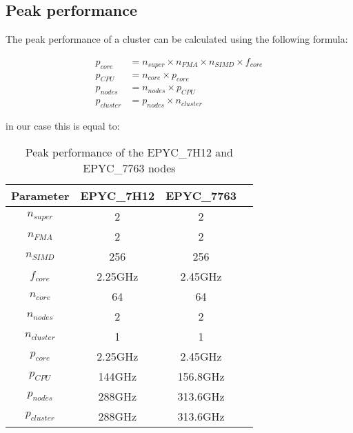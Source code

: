 \documentclass[unicode,11pt,a4paper,oneside,numbers=endperiod,openany]{scrartcl}
\begin{document}
\subsection{Peak performance}

The peak performance of a cluster can be calculated using the following formula:


\begin{align*}
    p_{core}    & = n_{super} \times n_{FMA} \times n_{SIMD} \times f_{core} \\
    p_{CPU}     & = n_{core} \times p_{core}                                 \\
    p_{nodes}   & = n_{nodes} \times p_{CPU}                                 \\
    p_{cluster} & = p_{nodes} \times n_{cluster}
\end{align*}


in our case this is equal to:

\begin{table}
    \centering

    \begin{tabular}{|c|c|c|c}
        \hline
        \textbf{Parameter} & \textbf{EPYC\_7H12} & \textbf{EPYC\_7763} \\
        \hline
        $n_{super}$        & 2                   & 2                   \\
        \hline
        $n_{FMA}$          & 2                   & 2                   \\
        \hline
        $n_{SIMD}$         & 256                 & 256                 \\
        \hline
        $f_{core}$         & 2.25GHz             & 2.45GHz             \\
        \hline
        $n_{core}$         & 64                  & 64                  \\
        \hline
        $n_{nodes}$        & 2                   & 2                   \\
        \hline
        $n_{cluster}$      & 1                   & 1                   \\
        \hline
        $p_{core}$         & 2.25GHz             & 2.45GHz             \\
        \hline
        $p_{CPU}$          & 144GHz              & 156.8GHz            \\
        \hline
        $p_{nodes}$        & 288GHz              & 313.6GHz            \\
        \hline
        $p_{cluster}$      & 288GHz              & 313.6GHz            \\
        \hline
    \end{tabular}
    \caption{Peak performance of the EPYC\_7H12 and EPYC\_7763 nodes}
    \label{tab:peak_performance}
\end{table}
\end{document}
